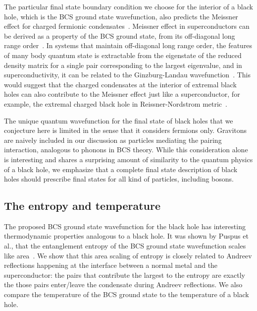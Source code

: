 \documentclass[12pt,letterpaper,aps,onecolumn,superscriptaddress,floatfix,notitlepage]{revtex4-1}
\begin{document}
	The particular final state boundary condition  we choose for the interior of a black hole, which is the BCS ground state wavefunction, also predicts the Meissner effect for charged fermionic condensates~\cite{BCS}. Meissner effect in superconductors can be derived as a property of the BCS ground state, from its off-diagonal long range order~\cite{rensink1967off,nieh1995off}. In systems that maintain off-diagonal long range order, the features of many body quantum state is extractable from the eigenstate of the reduced density matrix for a single pair corresponding to the largest eigenvalue, and in superconductivity, it can be related to the Ginzburg-Landau
	wavefunction~\cite{nieh1995off}. This would suggest that the charged condensates at the interior of extremal black holes can also contribute to the Meissner effect just like a superconductor, for example, the extremal charged black hole in Reissner-Nordstrom metric~\cite{bivcak1980stationary,penna2014black}. 
	
	The unique quantum wavefunction for the final state of black holes that we conjecture here is limited in the sense that it considers fermions only. Gravitons are naively included in our discussion as particles mediating the pairing interaction, analogous to phonons in BCS theory. While this consideration alone is interesting and shares a surprising amount of similarity to the quantum physics of a black hole, we emphasize that a complete final state description of black holes should prescribe final states for all kind of particles, including bosons.    
	\subsection{The entropy and temperature}   
	The proposed BCS ground state wavefunction for the black hole has interesting thermodynamic properties analogous to a black hole. It was shown by Puspus et al., that the entanglement entropy of the BCS ground state wavefunction scales like area~\cite{puspus2014entanglement}. We show that this area scaling of entropy is closely related to Andreev reflections happening at the interface between a normal metal and the superconductor: the pairs that contribute the largest to the entropy are exactly the those pairs enter/leave the condensate during Andreev reflections. We also compare the temperature of the BCS ground state to the temperature of a black hole.
	
\end{document}
